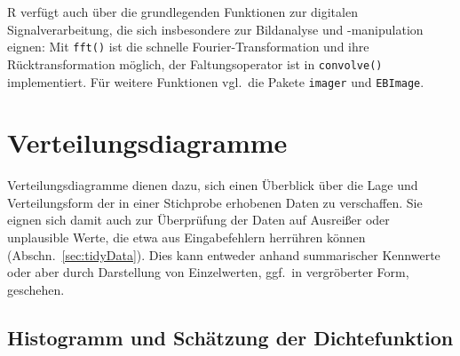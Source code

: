 R verfügt auch über die grundlegenden Funktionen zur digitalen Signalverarbeitung, die sich insbesondere zur Bildanalyse und -manipulation eignen: Mit  \lstinline!fft()! ist die schnelle Fourier-Transformation und ihre Rücktransformation möglich, der Faltungsoperator ist in \lstinline!convolve()! implementiert. Für weitere Funktionen vgl.\ die Pakete \lstinline!imager! und \lstinline!EBImage!.

\section{Verteilungsdiagramme}
\label{sec:distDiag}

Verteilungsdiagramme dienen dazu, sich einen Überblick über die Lage und Verteilungsform der in einer Stichprobe erhobenen Daten zu verschaffen. Sie eignen sich damit auch zur Überprüfung der Daten auf Ausreißer oder unplausible Werte, die etwa aus Eingabefehlern herrühren können (Abschn.\ \ref{sec:tidyData}). Dies kann entweder anhand summarischer Kennwerte oder aber durch Darstellung von Einzelwerten, ggf.\ in vergröberter Form, geschehen.

\subsection{Histogramm und Schätzung der Dichtefunktion}
\label{sec:hist}

